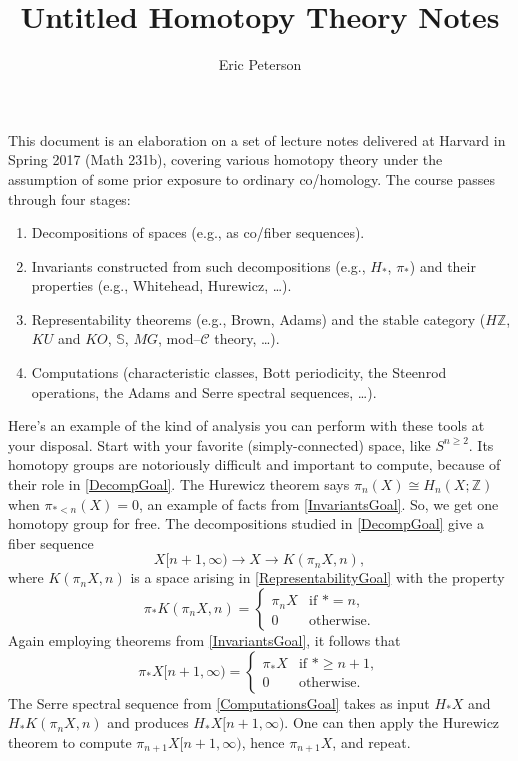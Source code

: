 \documentclass{amsart}
\title{Untitled Homotopy Theory Notes}
\author{Eric Peterson}
\newcommand{\Z}{\mathbb Z}
\renewcommand{\S}{\mathbb S}
\newcommand{\CC}{\mathcal{C}}
\theoremstyle{plain}
\theoremstyle{definition}
\theoremstyle{remark}
\begin{document}
\maketitle

This document is an elaboration on a set of lecture notes delivered at Harvard in Spring 2017 (Math 231b), covering various homotopy theory under the assumption of some prior exposure to ordinary co/homology.  The course passes through four stages:

\begin{enumerate}
	\item Decompositions of spaces (e.g., as co/fiber sequences).\label{DecompGoal}
	\item Invariants constructed from such decompositions (e.g., $H_*$, $\pi_*$) and their properties (e.g., Whitehead, Hurewicz, \ldots).\label{InvariantsGoal}
	\item Representability theorems (e.g., Brown, Adams) and the stable category ($H\Z$, $KU$ and $KO$, $\S$, $MG$, mod--$\CC$ theory, \ldots).\label{RepresentabilityGoal}
	\item Computations (characteristic classes, Bott periodicity, the Steenrod operations, the Adams and Serre spectral sequences, \ldots).\label{ComputationsGoal}
\end{enumerate}

Here's an example of the kind of analysis you can perform with these tools at your disposal.  Start with your favorite (simply-connected) space, like $S^{n \ge 2}$.  Its homotopy groups are notoriously difficult and important to compute, because of their role in \eqref{DecompGoal}.  The Hurewicz theorem says $\pi_n(X) \cong H_n(X; \Z)$ when $\pi_{* < n}(X) = 0$, an example of facts from \eqref{InvariantsGoal}.  So, we get one homotopy group for free.  The decompositions studied in \eqref{DecompGoal} give a fiber sequence \[X[n+1, \infty) \to X \to K(\pi_n X, n),\] where $K(\pi_n X, n)$ is a space arising in \eqref{RepresentabilityGoal} with the property \[\pi_* K(\pi_n X, n) = \begin{cases} \pi_n X & \text{if $* = n$}, \\ 0 & \text{otherwise}. \end{cases}\]  Again employing theorems from \eqref{InvariantsGoal}, it follows that \[\pi_* X[n+1, \infty) = \begin{cases} \pi_* X & \text{if $* \ge n + 1$}, \\ 0 & \text{otherwise}. \end{cases}\]  The Serre spectral sequence from \eqref{ComputationsGoal} takes as input $H_* X$ and $H_* K(\pi_n X, n)$ and produces $H_* X[n+1, \infty)$.  One can then apply the Hurewicz theorem to compute $\pi_{n+1} X[n+1, \infty)$, hence $\pi_{n+1} X$, and repeat.
\end{document}
